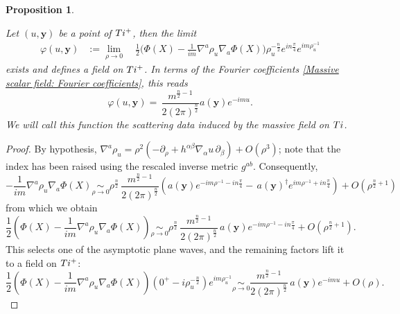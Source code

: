 \documentclass[10pt,a4paper]{amsart}
\newtheorem{comment}{Comment}
\newtheorem{proposition}{Proposition}
\newcommand{\Ti}{\textnormal{Ti}}
\newcommand{\y}{\bm{y}}
\begin{document}
\begin{proposition}\mbox{}

\label{Proposition::MassiveScalar}

Let $(u, \y )$ be a point of $\Ti^{+}$, then the limit
\begin{align}
    \varphi(u, \y) &:= \lim_{\rho\to 0} \quad \frac{1}{2}\Big(    \Phi(X) - \frac{1}{i m} \nabla^a \rho_u \nabla_a\Phi(X) \Big) \rho_u^{-\frac{n}{2}}e^{in\frac{\pi}{4}} e^{i m \rho_u^{-1}} \label{Eq::AsymptoticScalar1}
\end{align}
exists and defines a field on $\Ti^+$. In terms of the Fourier coefficients \eqref{Massive scalar field: Fourier coefficients}, this reads
\begin{equation}
    \varphi(u, \y) = \, \frac{m^{\frac{n}{2}-1}}{2 (2\pi)^{\frac{n}{2}}}  a(\y) e^{-im u}. \label{Eq::AsymptoticScalar2}
\end{equation}
We will call this function the scattering data induced by the massive field on $\Ti$.
\end{proposition}

\begin{proof}\mbox{}

By hypothesis, $\nabla^a \rho_u = \rho^{2}\left( - \partial_{\rho} + h^{\alpha\beta}\nabla_{\alpha} u \,\partial_{\beta} \right) +O(\rho^3)$; note that the index has been raised using the rescaled inverse metric $g^{ab}$. Consequently,
\begin{equation}
    - \frac{1}{i m}\nabla^a \rho_u \nabla_a\Phi(X) \underset{\rho \to 0}{\sim} \rho^{\frac{n}{2}} \, \frac{m^{\frac{n}{2}-1}}{2 (2\pi)^{\frac{n}{2}}}  \left( a(\y) e^{- im \rho^{-1}-in\frac{\pi}{4}} - \, a(\y)^{\dagger} e^{im \rho^{-1}+in\frac{\pi}{4}} \right)  + O(\rho^{\frac{n}{2}+1} )
\end{equation}
from which we obtain
\begin{equation}
\frac{1}{2}\left(\Phi(X) - \frac{1}{i m}\nabla^a \rho_u \nabla_a\Phi(X) \right) \underset{\rho \to 0}{\sim} \rho^{\frac{n}{2}} \, \frac{m^{\frac{n}{2}-1}}{2 (2\pi)^{\frac{n}{2}}}  \, a(\y) e^{- im \rho^{-1}-in\frac{\pi}{4}}    + O(\rho^{\frac{n}{2}+1} ).
\end{equation}
This selects one of the asymptotic plane waves, and the remaining factors lift it to a field on $\Ti^+$:
\begin{equation}
\frac{1}{2}\left(\Phi(X) - \frac{1}{i m}\nabla^a \rho_u \nabla_a\Phi(X) \right)  (0^+-i\rho_u^{-\frac{n}{2}})  e^{i m  \rho_u^{-1}} \underset{\rho \to 0}{\sim}  \frac{m^{\frac{n}{2}-1}}{2 (2\pi)^{\frac{n}{2}}} \, a(\y) e^{- im u}    + O(\rho).
\end{equation}

\end{proof}
\end{document}
